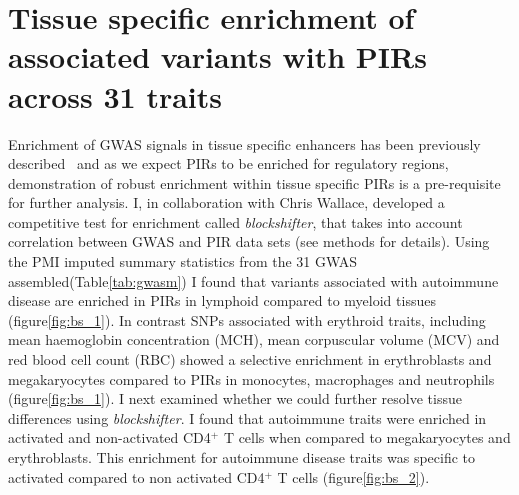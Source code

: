 \documentclass[a4paper,11pt]{report}
\begin{document}

\section{Tissue specific enrichment of associated variants with PIRs across 31 traits}
Enrichment of GWAS signals in tissue specific enhancers has been previously described~\citep{MauranoHumbertRynesEtAl2012} and as we expect PIRs to be enriched for regulatory regions, demonstration of robust enrichment within tissue specific PIRs is a pre-requisite for further analysis.  
I, in collaboration with Chris Wallace, developed a competitive test for enrichment called \textit{blockshifter}, that takes into account correlation between GWAS and PIR data sets (see methods for details). Using the PMI imputed summary statistics from the 31 GWAS assembled(Table\ref{tab:gwasm}) I found that variants associated with autoimmune disease are enriched in PIRs in lymphoid compared to myeloid tissues (figure\ref{fig:bs_1}). In contrast SNPs associated with erythroid traits, including mean haemoglobin concentration (MCH), mean corpuscular volume (MCV) and red blood cell count (RBC) showed a selective enrichment in erythroblasts and megakaryocytes compared to PIRs in monocytes, macrophages and neutrophils (figure\ref{fig:bs_1}). I next examined whether we could further resolve tissue differences using \textit{blockshifter}. I found that autoimmune traits were enriched in activated and non-activated CD4$^{+}$ T cells when compared to megakaryocytes and erythroblasts. This enrichment for autoimmune disease traits was specific to activated  compared to non activated CD4$^{+}$ T cells (figure\ref{fig:bs_2}).
\end{document}

